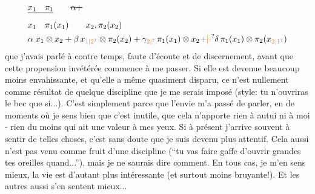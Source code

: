 \[
\begin{aligned}
&\deleted{x_1\quad\pi_1}\qquad\deleted{\alpha+}\\
&x_1\quad\pi_1(x_1)\qquad x_2,\pi_2(x_2)\\
&\alpha\; x_1\otimes x_2+\beta\,x_{\unsure{1|2}}\otimes\pi_2(x_{2})
+\gamma_{\unsure{2|{}}}\,\pi_1(x_1)\otimes x_2\unsure{+|\cdot}\delta\,\pi_1(x_1)\otimes\pi_2(x_{\unsure{2|1}})
\end{aligned}
\]
que j'avais parlé à contre temps, faute d'écoute et de discernement, avant que cette propension invétérée commence à me passer. Si elle est devenue beaucoup moins envahissante, et qu'elle a même quasiment disparu, ce n'est nullement comme résultat de quelque discipline que je me serais imposé (style: tu n'ouvriras le bec que si...). C'est simplement parce que l'envie m'a passé de parler, en de moments où je sens bien que c'est inutile, que cela n'apporte rien à autui ni à moi - rien du moins qui ait une valeur à mes yeux. Si à présent j'arrive souvent à sentir de telles choses, c'est sans doute que je suis devenu plus attentif. Cela aussi n'est pas venu comme fruit d'une discipline (``tu vas faire gaffe d'ouvrir grandes tes oreilles quand...''), mais je ne saurais dire comment. En tous cas, je m'en sens mieux, la vie est d'autant plus intéressante (et surtout moins bruyante!). Et les autres aussi s'en sentent mieux...

